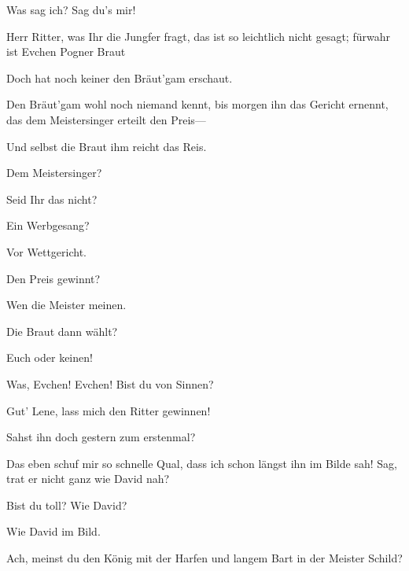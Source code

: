 \begin{drama}
\Evaspeaks
{}
Was sag ich? Sag du's mir!


\Magdalenespeaks
{}

Herr Ritter, was Ihr die Jungfer fragt,
das ist so leichtlich nicht gesagt;
fürwahr ist Evchen Pogner Braut

\Evaspeaks
{}

Doch hat noch keiner den Bräut'gam erschaut.

\Magdalenespeaks
Den Bräut'gam wohl noch niemand kennt,
bis morgen ihn das Gericht ernennt,
das dem Meistersinger erteilt den Preis---

\Evaspeaks
{}

Und selbst die Braut ihm reicht das Reis.

\Waltherspeaks
{}

Dem Meistersinger?

\Evaspeaks
{}

Seid Ihr das nicht?

\Waltherspeaks
Ein Werbgesang?

\Magdalenespeaks
Vor Wettgericht.

\Waltherspeaks
Den Preis gewinnt?

\Magdalenespeaks
Wen die Meister meinen.

\Waltherspeaks
Die Braut dann wählt?

\Evaspeaks


Euch oder keinen!


\Magdalenespeaks
{}

Was, Evchen! Evchen! Bist du von Sinnen?

\Evaspeaks
Gut' Lene, lass mich den Ritter gewinnen!

\Magdalenespeaks
Sahst ihn doch gestern zum erstenmal?

\Evaspeaks
Das eben schuf mir so schnelle Qual,
dass ich schon längst ihn im Bilde sah!
Sag, trat er nicht ganz wie David nah?

\Magdalenespeaks
{}

Bist du toll? Wie David?

\Evaspeaks
Wie David im Bild.

\Magdalenespeaks
Ach, meinst du den König mit der Harfen
und langem Bart in der Meister Schild?


\end{drama}
